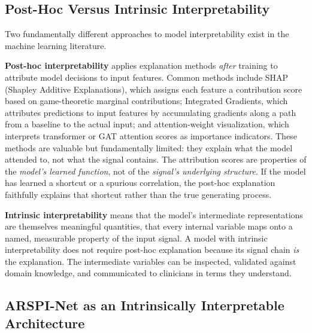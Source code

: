 \subsection{Post-Hoc Versus Intrinsic Interpretability}

Two fundamentally different approaches to model interpretability exist in the machine learning literature.

\textbf{Post-hoc interpretability} applies explanation methods \emph{after} training to attribute model decisions to input features. Common methods include SHAP (Shapley Additive Explanations), which assigns each feature a contribution score based on game-theoretic marginal contributions; Integrated Gradients, which attributes predictions to input features by accumulating gradients along a path from a baseline to the actual input; and attention-weight visualization, which interprets transformer or GAT attention scores as importance indicators. These methods are valuable but fundamentally limited: they explain what the model attended to, not what the signal contains. The attribution scores are properties of the \emph{model's learned function}, not of the \emph{signal's underlying structure}. If the model has learned a shortcut or a spurious correlation, the post-hoc explanation faithfully explains that shortcut rather than the true generating process.

\textbf{Intrinsic interpretability} means that the model's intermediate representations are themselves meaningful quantities, that every internal variable maps onto a named, measurable property of the input signal. A model with intrinsic interpretability does not require post-hoc explanation because its signal chain \emph{is} the explanation. The intermediate variables can be inspected, validated against domain knowledge, and communicated to clinicians in terms they understand.

\subsection{ARSPI-Net as an Intrinsically Interpretable Architecture}

